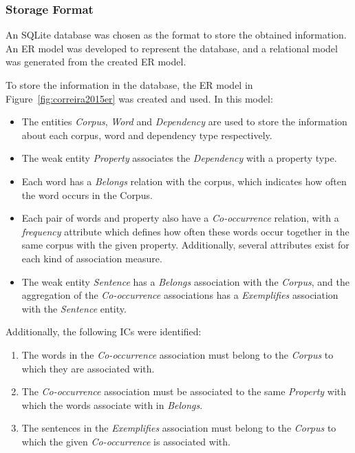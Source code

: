 \subsubsection*{Storage Format}

An SQLite database was chosen as the format to store the obtained information.
An \ac{ER} model was developed to represent the database, and a relational model
was generated from the created \ac{ER} model.

To store the information in the database, the \ac{ER} model in
Figure~\ref{fig:correira2015er} was created and used. In this model:

\begin{itemize}
	\item The entities \textit{Corpus}, \textit{Word} and \textit{Dependency} 
	are used to store the information about each corpus, word and dependency 
	type respectively.
	
	\item The weak entity \textit{Property} associates the \textit{Dependency} 
	with a property type.
	
	\item Each word has a \textit{Belongs} relation with the corpus, which 
	indicates how often the word occurs in the Corpus.
	
	\item Each pair of words and property also have a \textit{Co-occurrence} 
	relation, with a \textit{frequency} attribute which defines how often these 
	words occur together in the same corpus with the given property. 
	Additionally, several attributes exist for each kind of association measure.
	
	\item The weak entity \textit{Sentence} has a \textit{Belongs} association 
	with the \textit{Corpus}, and the aggregation of the \textit{Co-occurrence} 
	associations has a \textit{Exemplifies} association with the 
	\textit{Sentence} entity.
\end{itemize}

Additionally, the following \acp{IC} were identified:

\begin{enumerate}
  \item The words in the \textit{Co-occurrence} association must belong to the
\textit{Corpus} to which they are associated with.
  \item The \textit{Co-occurrence} association must be associated to the same
\textit{Property} with which the words associate with in \textit{Belongs}.
  \item The sentences in the \textit{Exemplifies} association must belong to the
\textit{Corpus} to which the given \textit{Co-occurrence} is associated with.
\end{enumerate}

